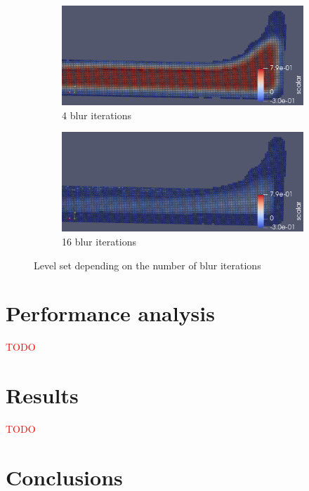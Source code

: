 \begin{figure}[H]
        \begin{subfigure}[b]{0.5\textwidth}
               \includegraphics[width=\textwidth]{figures/LevelSetBlurIterations4.png}
				\caption{4 blur iterations}
               \label{fig:ls_bi_original}
        \end{subfigure}
        \begin{subfigure}[b]{0.5\textwidth}
               \includegraphics[width=\textwidth]{figures/LevelSetBlurIterations16.png}
				\caption{16 blur iterations}

				\label{fig:ls_bi_16iteration}
        \end{subfigure}
       \caption{Level set depending on the number of blur iterations}
       \label{fig:bi_levelset}
\end{figure}


\section{Performance analysis}
\textcolor{red}{TODO}
\section{Results}
\textcolor{red}{TODO}
\section{Conclusions}

